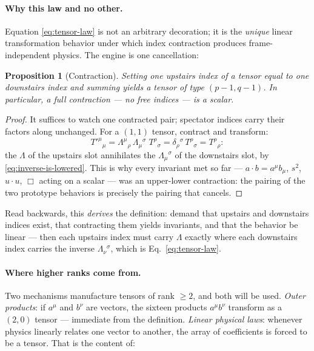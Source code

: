 \documentclass[11pt]{article}
\theoremstyle{plain}
\newtheorem{proposition}[theorem]{Proposition}
\theoremstyle{definition}
\theoremstyle{remark}
\begin{document}
\paragraph{Why this law and no other.} Equation \eqref{eq:tensor-law}
is not an arbitrary decoration; it is the \emph{unique} linear
transformation behavior under which index contraction produces
frame-independent physics. The engine is one cancellation:

\begin{proposition}[Contraction]\label{prop:contraction}
Setting one upstairs index of a tensor equal to one downstairs index
and summing yields a tensor of type $(p{-}1, q{-}1)$. In particular, a
full contraction --- no free indices --- is a scalar.
\end{proposition}

\begin{proof}
It suffices to watch one contracted pair; spectator indices carry
their factors along unchanged. For a $(1,1)$ tensor, contract and
transform:
\begin{equation}
  T'^{\mu}{}_{\mu}
  = \Lambda^\mu{}_\rho\,\Lambda_\mu{}^\sigma\;
    T^{\rho}{}_{\sigma}
  = \delta_\rho{}^{\sigma}\, T^{\rho}{}_{\sigma}
  = T^{\rho}{}_{\rho} :
\end{equation}
the $\Lambda$ of the upstairs slot annihilates the
$\Lambda_\mu{}^\sigma$ of the downstairs slot, by
\eqref{eq:inverse-is-lowered}. This is why every invariant met so far ---
$a \cdot b = a^\mu b_\mu$, $s^2$, $u \cdot u$, $\Box$ acting on a
scalar --- was an upper-lower contraction: the pairing of the two
prototype behaviors is precisely the pairing that cancels.
\end{proof}

\noindent
Read backwards, this \emph{derives} the definition: demand that
upstairs and downstairs indices exist, that contracting them yields
invariants, and that the behavior be linear --- then each upstairs
index must carry $\Lambda$ exactly where each downstairs index carries
the inverse $\Lambda_\nu{}^\sigma$, which is
Eq.~\eqref{eq:tensor-law}.

\paragraph{Where higher ranks come from.} Two mechanisms manufacture
tensors of rank $\ge 2$, and both will be used.
\emph{Outer products}: if $a^\mu$ and $b^\nu$ are vectors, the
sixteen products $a^\mu b^\nu$ transform as a $(2,0)$ tensor ---
immediate from the definition. \emph{Linear physical laws}: whenever
physics linearly relates one vector to another, the array of
coefficients is forced to be a tensor. That is the content of:
\end{document}
